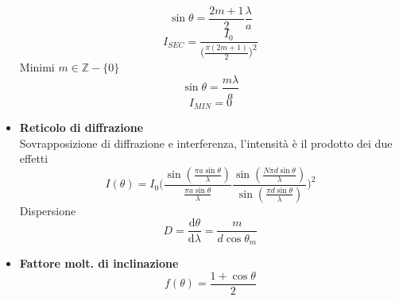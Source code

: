 \documentclass{book}
\newcommand{\g}{\textbf}
\newcommand{\e}{\begin{equation}}
\newcommand{\ex}{\end{equation} }
\renewcommand{\it}{\item[$\cdot$]}
\begin{document}
\begin{multicols}{4}
\begin{itemize}
        \e{\sin\theta=\frac{2m+1}{2}\frac{\lambda}{a}} \ex
        \e{I_{SEC}=\frac{I_0}{\bigl( \frac{\pi(2m+1)}{2} \bigr)^2}} \ex
        Minimi $m\in\mathbb{Z}-\{0\}$
        \e{\sin\theta=\frac{m\lambda}{a}}\ex
        \e{I_{MIN}=0}\ex
    \it \g{Reticolo di diffrazione} \\
        Sovrapposizione di diffrazione e interferenza, l'intensità è il prodotto dei due effetti \\
        \e{I(\theta)=I_0 \biggl( \frac{\sin(\frac{\pi a \sin\theta}{\lambda})}{\frac{\pi a \sin\theta}{\lambda}} 
        \frac{\sin(\frac{N\pi d \sin\theta}{\lambda})}{\sin(\frac{\pi d \sin\theta}{\lambda})}   \biggr)^2}\ex
        Dispersione
        \e{D=\frac{\mathrm{d}\theta}{\mathrm{d}\lambda}=\frac{m}{d\cos\theta_m}}\ex
    \it \g{Fattore molt. di inclinazione}
        \e{f(\theta)=\frac{1+\cos{\theta}}{2}}\ex
\end{itemize}
\end{multicols}

\hline
\end{document}
